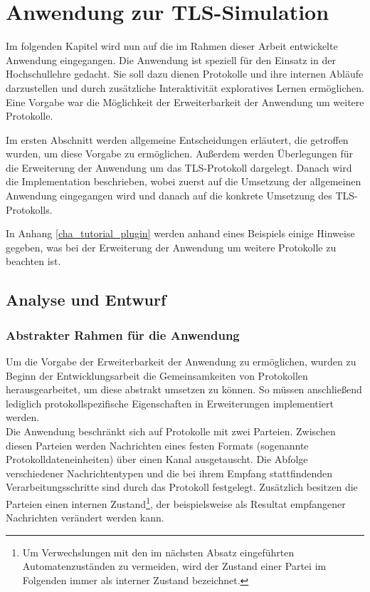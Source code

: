 \chapter{Anwendung zur TLS-Simulation}
\label{cha_implementation}

Im folgenden Kapitel wird nun auf die im Rahmen dieser Arbeit entwickelte Anwendung eingegangen. 
Die Anwendung ist speziell für den Einsatz in der Hochschullehre gedacht. Sie soll dazu dienen Protokolle und ihre internen Abläufe darzustellen und durch zusätzliche Interaktivität exploratives Lernen ermöglichen. Eine Vorgabe war die Möglichkeit der Erweiterbarkeit der Anwendung um weitere Protokolle. 

Im ersten Abschnitt werden allgemeine Entscheidungen erläutert, die getroffen wurden, um diese Vorgabe zu ermöglichen. Außerdem werden Überlegungen für die Erweiterung der Anwendung um das TLS-Protokoll dargelegt.
Danach wird die Implementation beschrieben, wobei zuerst auf die Umsetzung der allgemeinen Anwendung eingegangen wird und danach auf die konkrete Umsetzung des TLS-Protokolls.

In Anhang \ref{cha_tutorial_plugin} werden anhand eines Beispiels einige Hinweise gegeben, was bei der Erweiterung der Anwendung um weitere Protokolle zu beachten ist.

\section{Analyse und Entwurf}

\subsection{Abstrakter Rahmen für die Anwendung}

Um die Vorgabe der Erweiterbarkeit der Anwendung zu ermöglichen, wurden zu Beginn der Entwicklungsarbeit die Gemeinsamkeiten von Protokollen herausgearbeitet, um diese abstrakt umsetzen zu können. So müssen anschließend lediglich protokollspezifische Eigenschaften in Erweiterungen implementiert werden.\\
Die Anwendung beschränkt sich auf Protokolle mit zwei Parteien. Zwischen diesen Parteien werden Nachrichten eines festen Formats (sogenannte Protokolldateneinheiten) über einen Kanal ausgetauscht. Die Abfolge verschiedener Nachrichtentypen und die bei ihrem Empfang stattfindenden Verarbeitungsschritte sind durch das Protokoll festgelegt. Zusätzlich besitzen die Parteien einen internen Zustand\footnote{
	Um Verwechslungen mit den im nächsten Absatz eingeführten Automatenzuständen zu vermeiden, wird der Zustand einer Partei im Folgenden immer als interner Zustand bezeichnet.
}, der beispielsweise als Resultat empfangener Nachrichten verändert werden kann. 

